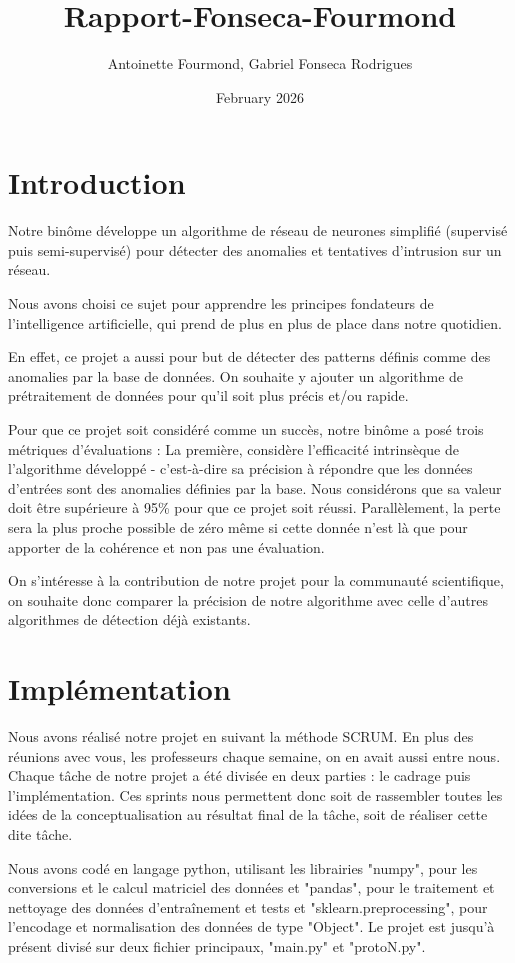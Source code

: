 \documentclass{article}
\title{Rapport-Fonseca-Fourmond}
\author{Antoinette Fourmond, Gabriel Fonseca Rodrigues }
\date{February 2026}
\begin{document}
\maketitle

\section{Introduction}
Notre binôme développe un algorithme de réseau de neurones simplifié (supervisé puis semi-supervisé) pour détecter des anomalies et tentatives d'intrusion 
sur un réseau.

Nous avons choisi ce sujet pour apprendre les principes fondateurs de l’intelligence artificielle, qui prend de plus en plus de place dans notre quotidien.

En effet, ce projet a aussi pour but de détecter des patterns définis comme des anomalies par la base de données. On souhaite y ajouter un algorithme de 
prétraitement de données pour qu’il soit plus précis et/ou rapide.

Pour que ce projet soit considéré comme un succès, notre binôme a posé trois métriques d'évaluations : 
La première, considère l'efficacité intrinsèque de l'algorithme développé -  c'est-à-dire sa précision à répondre que les données d’entrées sont des anomalies
définies par la base. Nous considérons que sa valeur doit être supérieure à 95\% pour que ce projet soit réussi. Parallèlement, la perte sera la plus proche 
possible de zéro même si cette donnée n’est là que pour apporter de la cohérence et non pas une évaluation.

On s'intéresse à la contribution de notre projet pour la communauté scientifique, on souhaite donc comparer la précision de notre algorithme avec celle d'autres
algorithmes de détection déjà existants.


\section{Implémentation}
Nous avons réalisé notre projet en suivant la méthode SCRUM. En plus des réunions avec vous, les professeurs chaque semaine, on en avait aussi entre nous.
Chaque tâche de notre projet a été divisée en deux parties : le cadrage puis l’implémentation. Ces sprints nous permettent donc soit de rassembler toutes 
les idées de la conceptualisation au résultat final de la tâche, soit de réaliser cette dite tâche.

Nous avons codé en langage python, utilisant les librairies "numpy", pour les conversions et le calcul matriciel des données et "pandas", pour le 
traitement et nettoyage des données d'entraînement et tests et "sklearn.preprocessing", pour l'encodage et normalisation des données de type "Object".
Le projet est jusqu'à présent divisé sur deux fichier principaux, "main.py" et "protoN.py".
\end{document}
